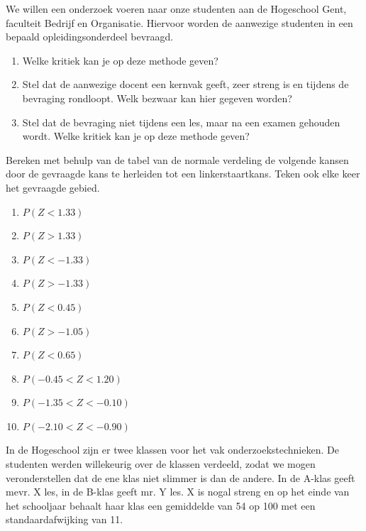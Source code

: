 {\begin{exercise}
  We willen een onderzoek voeren naar onze studenten aan de Hogeschool Gent, faculteit Bedrijf en Organisatie. Hiervoor worden de aanwezige studenten in een bepaald opleidingsonderdeel bevraagd.
  
  \begin{enumerate}[label=\alph*.]
    \item Welke kritiek kan je op deze methode geven?
    \item Stel dat de aanwezige docent een kernvak geeft, zeer streng is en tijdens de bevraging rondloopt. Welk bezwaar kan hier gegeven worden?
    \item Stel dat de bevraging niet tijdens een les, maar na een examen gehouden wordt. Welke kritiek kan je op deze methode geven?
  \end{enumerate}
\end{exercise}

\begin{exercise}
  Bereken met behulp van de tabel van de normale verdeling de volgende kansen door de gevraagde kans te herleiden tot een linkerstaartkans. Teken ook elke keer het gevraagde gebied.
  \begin{enumerate}[label=\alph*.]
    \item $P(Z < 1.33)$
    \item $P(Z > 1.33)$
    \item $P(Z < -1.33)$
    \item $P(Z > -1.33)$
    \item $P(Z < 0.45)$
    \item $P(Z > -1.05)$
    \item $P(Z < 0.65)$
    \item $P(-0.45 < Z < 1.20)$
    \item $P(-1.35 < Z < -0.10)$
    \item $P(-2.10 < Z < -0.90)$
  \end{enumerate}
\end{exercise}

\begin{exercise}
  In de  Hogeschool zijn er twee klassen voor het vak onderzoekstechnieken. De studenten werden willekeurig over de klassen verdeeld, zodat we mogen veronderstellen dat de ene klas niet slimmer is dan de andere. In de A-klas geeft mevr. X les, in de B-klas geeft mr. Y les. X is nogal streng en op het einde van het schooljaar behaalt haar klas een gemiddelde van 54 op 100 met een standaardafwijking van 11.


\end{exercise}}
